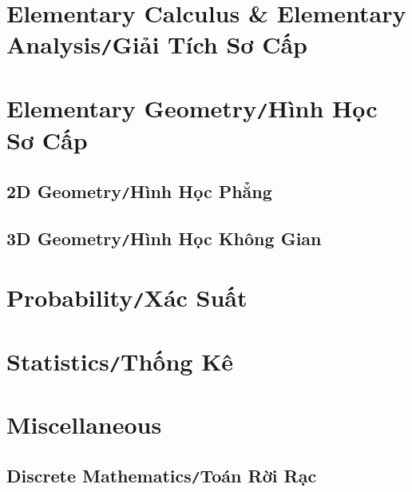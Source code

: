 \documentclass{article}
\numberwithin{equation}{section}
\begin{document}
\section{Elementary Calculus \& Elementary Analysis\texttt{/}Giải Tích Sơ Cấp}

\section{Elementary Geometry\texttt{/}Hình Học Sơ Cấp}

\subsection{2D Geometry\texttt{/}Hình Học Phẳng}

\subsection{3D Geometry\texttt{/}Hình Học Không Gian}

\section{Probability\texttt{/}Xác Suất}

\section{Statistics\texttt{/}Thống Kê}

\section{Miscellaneous}

\subsection{Discrete Mathematics\texttt{/}Toán Rời Rạc}

	
\end{document}
